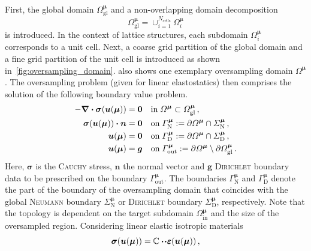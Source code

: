 \documentclass[a4paper]{eccomas_paper-2024}
\newcommand{\m}{\bm\mu}
\newcommand{\out}{\mathrm{out}}
\newcommand{\inrm}{\mathrm{in}}
\begin{document}
First, the global domain $\varOmega_{\mathrm{gl}}^{\bm\mu}$ and a non-overlapping domain decomposition
\begin{equation}
	\varOmega_{\mathrm{gl}}^{\bm\mu}=\cup_{i=1}^{N_{\mathrm{cells}}} \varOmega_i^{\bm\mu}
\end{equation}
is introduced.
In the context of lattice structures, each subdomain $\varOmega_i^{\bm\mu}$ corresponds to a unit cell.
Next, a coarse grid partition of the global domain and a fine grid partition of the unit cell is introduced as shown in~\cref{fig:oversampling_domain}.
 also shows one exemplary oversampling domain $\varOmega^{\bm\mu}$.
The oversampling problem (given for linear elastostatics) then comprises the solution of the following boundary value problem.
\begin{align}
	\begin{split}
	\label{eq:osp_p}
    - \div{\bm{\sigma}} (\bm{u}(\bm\mu)) &= \bm{0} \quad  \mathrm{in}\;{\varOmega^{\bm\mu}}\subset\varOmega^{\bm\mu}_{\mathrm{gl}}\,,\\
    \bm{\sigma}(\bm{u}(\bm\mu)) \vdot \bm{n} &= \bm{0} \quad \mathrm{on}\; \varGamma^{\m}_{\mathrm{N}}:= \partial\varOmega^{\m}\cap\varSigma^{\m}_{\mathrm{N}}\,,\\
    \bm{u}(\bm\mu) &= \bm{0} \quad  \mathrm{on}\;\varGamma^{\m}_{\mathrm{D}}:=\partial\varOmega^{\m}\cap\varSigma^{\m}_{\mathrm{D}}\,,\\
    \bm{u}(\bm\mu) &= \bm{g}\quad\mathrm{on}\;\varGamma^{\m}_{\mathrm{out}}:= \partial\varOmega^{\m} \setminus\partial\varOmega^{\m}_{\mathrm{gl}}\,.
	\end{split}
\end{align}
Here, $\bm\sigma$ is the \textsc{Cauchy} stress, $\bm{n}$ the normal vector and $\bm{g}$ \textsc{Dirichlet} boundary data to be prescribed on the boundary $\varGamma^{\m}_{\out}$.
The boundaries $\varGamma^{\m}_{\mathrm{N}}$ and $\varGamma^{\m}_{\mathrm{D}}$ denote the part of the boundary of the oversampling domain that coincides with the global \textsc{Neumann} boundary $\varSigma^{\m}_{\mathrm{N}}$ or \textsc{Dirichlet} boundary $\varSigma^{\m}_{\mathrm{D}}$, respectively.
Note that the topology is dependent on the target subdomain $\varOmega^{\m}_{\inrm}$ and the size of the oversampled region.
Considering linear elastic isotropic materials
\begin{equation}
    \bm\sigma(\bm{u}(\m)) = \mathbb{C}\vdot\!\vdot\bm\varepsilon(\bm{u}(\m))\,,
    \label{eq:hooke}
\end{equation}
\end{document}
